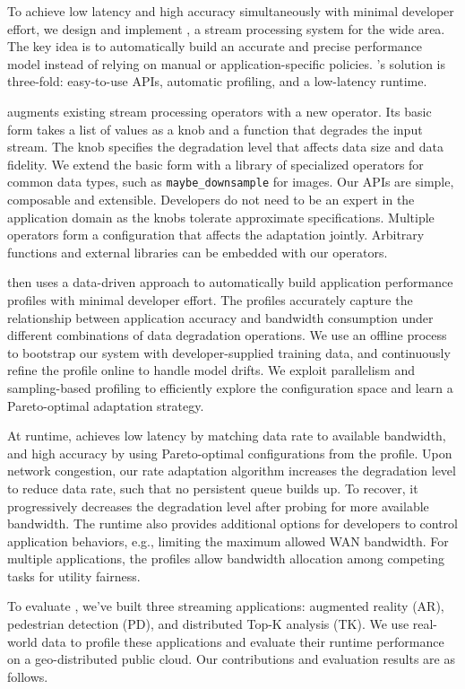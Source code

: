To achieve low latency and high accuracy simultaneously with minimal developer
effort, we design and implement \sysname{}, a stream processing system for the
wide area. The key idea is to automatically build an accurate and precise
performance model instead of relying on manual or application-specific
policies. \sysname{}'s solution is three-fold: easy-to-use APIs, automatic
profiling, and a low-latency runtime.

\sysname{} augments existing stream processing operators with a new \maybe{}
operator. Its basic form takes a list of values as a knob and a function that
degrades the input stream. The knob specifies the degradation level that affects
data size and data fidelity. We extend the basic form with a library of
specialized operators for common data types, such as \texttt{maybe\_downsample}
for images. Our APIs are simple, composable and extensible. Developers do not
need to be an expert in the application domain as the knobs tolerate approximate
specifications. Multiple operators form a configuration that affects the
adaptation jointly. Arbitrary functions and external libraries can be embedded
with our operators.

\sysname{} then uses a data-driven approach to automatically build application
performance profiles with minimal developer effort. The profiles accurately
capture the relationship between application accuracy and bandwidth consumption
under different combinations of data degradation operations. We use an offline
process to bootstrap our system with developer-supplied training data, and
continuously refine the profile online to handle model drifts. We exploit
parallelism and sampling-based profiling to efficiently explore the
configuration space and learn a Pareto-optimal adaptation strategy.

At runtime, \sysname{} achieves low latency by matching data rate to available
bandwidth, and high accuracy by using Pareto-optimal configurations from the
profile. Upon network congestion, our rate adaptation algorithm increases the
degradation level to reduce data rate, such that no persistent queue builds
up. To recover, it progressively decreases the degradation level after probing
for more available bandwidth. The runtime also provides additional options for
developers to control application behaviors, e.g., limiting the maximum allowed
WAN bandwidth. For multiple applications, the profiles allow bandwidth
allocation among competing tasks for utility fairness.

To evaluate \sysname{}, we've built three streaming applications: augmented
reality (AR), pedestrian detection (PD), and distributed Top-K analysis (TK). We
use real-world data to profile these applications and evaluate their runtime
performance on a geo-distributed public cloud. Our contributions and evaluation
results are as follows.

